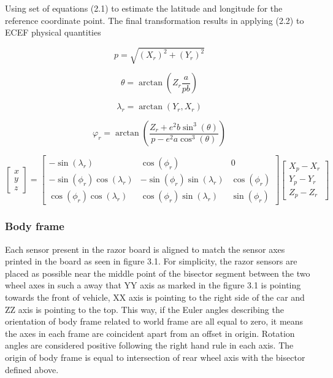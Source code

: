 Using set of equations (2.1) to estimate the latitude and longitude for the reference coordinate point. The final transformation results in applying (2.2) to ECEF physical quantities

\begin{equation}
    p = \sqrt{(X_r)^2 + (Y_r)^2}
\end{equation}

\begin{equation}
    \theta = \arctan(Z_r\frac{a}{pb} )
\end{equation}

\begin{equation}
    \lambda_r = \arctan(Y_r,X_r)
\end{equation}

\begin{equation}
    \varphi_r = \arctan(\frac{Z_r + e^2 b\sin^3(\theta)}{p - e^2 a \cos^3(\theta )} )
\end{equation}

\begin{equation}
    \begin{bmatrix}
        x \\
        y \\
        z
    \end{bmatrix}
    =
    \begin{bmatrix}
        -\sin(\lambda_r)             & \cos( \phi_r)                  & 0            \\
        -\sin(\phi_r)\cos(\lambda_r) & -\sin( \phi_r)\sin(\lambda_r)  & \cos(\phi_r) \\
        \cos(\phi_r)\cos(\lambda_r)  & \cos( \phi_r)  \sin(\lambda_r) & \sin(\phi_r)
    \end{bmatrix}
    \begin{bmatrix}
        X_p - X_r \\
        Y_p - Y_r \\
        Z_p - Z_r
    \end{bmatrix}
\end{equation}

\subsubsection{Body frame}

Each sensor present in the razor board is aligned to match the sensor axes printed in the board as
seen in figure 3.1. For simplicity, the razor sensors are placed as possible near the middle point of the
bisector segment between the two wheel axes in such a away that YY axis as marked in the figure 3.1
is pointing towards the front of vehicle, XX axis is pointing to the right side of the car and ZZ axis is
pointing to the top. This way, if the Euler angles describing the orientation of body frame related to world
frame are all equal to zero, it means the axes in each frame are coincident apart from an offset in origin.
Rotation angles are considered positive following the right hand rule in each axis. The origin of body
frame is equal to intersection of rear wheel axis with the bisector defined above.

